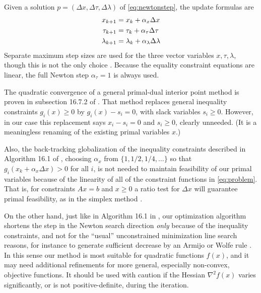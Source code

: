 \documentclass[11pt]{article}
\newcommand{\grad}{\nabla}
\begin{document}
Given a solution $p=(\Delta x,\Delta\tau,\Delta\lambda)$ of \eqref{eq:newtonstep}, the update formulas are
\begin{align}
x_{k+1} &= x_k + \alpha_x \Delta x \label{eq:updates} \\
\tau_{k+1} &= \tau_k + \alpha_\tau \Delta \tau \notag \\
\lambda_{k+1} &= \lambda_k + \alpha_\lambda \Delta \lambda \notag
\end{align}
Separate maximum step sizes are used for the three vector variables $x,\tau,\lambda$, though this is not the only choice \cite{YamashitaYabe1996}.  Because the equality constraint equations are linear, the full Newton step $\alpha_\tau=1$ is always used.

The quadratic convergence of a general primal-dual interior point method is proven in subsection 16.7.2 of \cite{GrivaNashSofer2009}.  That method replaces general inequality constraints $g_i(x)\ge 0$ by $g_i(x) - s_i =0$, with slack variables $s_i\ge 0$.  However, in our case this replacement says $x_i-s_i=0$ and $s_i\ge 0$, clearly unneeded.  (It is a meaningless renaming of the existing primal variables $x$.)

Also, the back-tracking globalization of the inequality constraints described in Algorithm 16.1 of \cite{GrivaNashSofer2009}, choosing $\alpha_x$ from $\{1,1/2,1/4,\dots\}$ so that $g_i(x_k + \alpha_x \Delta x) > 0$ for all $i$, is not needed to maintain feasibility of our primal variables because of the linearity of all of the constraint functions in \eqref{eq:problem}.  That is, for constraints $Ax=b$ and $x\ge 0$ a ratio test for $\Delta x$ will guarantee primal feasibility, as in the simplex method \cite[chapter 5]{GrivaNashSofer2009}.

On the other hand, just like in Algorithm 16.1 in \cite{GrivaNashSofer2009}, our optimization algorithm shortens the step in the Newton search direction \emph{only} because of the inequality constraints, and not for the ``usual'' unconstrained minimization line search reasons, for instance to generate sufficient decrease by an Armijo or Wolfe rule \cite[section 11.5]{GrivaNashSofer2009}.  In this sense our method is most suitable for quadratic functions $f(x)$, and it may need additional refinements for more general, especially non-convex, objective functions.  It should be used with caution if the Hessian $\grad^2 f(x)$ varies significantly, or is not positive-definite, during the iteration.
\end{document}
